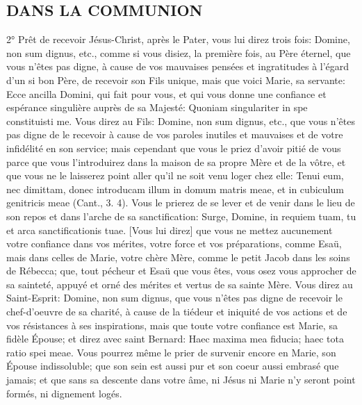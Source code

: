 \subsection{DANS LA COMMUNION}
 2° Prêt de recevoir Jésus-Christ, après le Pater, vous lui direz trois fois: Domine, non sum dignus, etc.,
comme si vous disiez, la première fois, au Père éternel, que vous n'êtes pas digne, à cause de vos mauvaises
pensées et ingratitudes à l'égard d'un si bon Père, de recevoir son Fils unique, mais que voici Marie, sa servante:
Ecce ancilla Domini, qui fait pour vous, et qui vous donne une confiance et espérance singulière auprès de sa
Majesté: Quoniam singulariter in spe constituisti me.
 Vous direz au Fils: Domine, non sum dignus, etc., que vous n'êtes pas digne de le recevoir à cause de vos
paroles inutiles et mauvaises et de votre infidélité en son service; mais cependant que vous le priez d'avoir pitié de
vous parce que vous l'introduirez dans la maison de sa propre Mère et de la vôtre, et que vous ne le laisserez
point aller qu'il ne soit venu loger chez elle: Tenui eum, nec dimittam, donec introducam illum in domum matris
meae, et in cubiculum genitricis meae (Cant., 3. 4). Vous le prierez de se lever et de venir dans le lieu de son
repos et dans l'arche de sa sanctification: Surge, Domine, in requiem tuam, tu et arca sanctificationis tuae. [Vous
lui direz] que vous ne mettez aucunement votre confiance dans vos mérites, votre force et vos préparations,
comme Esaü, mais dans celles de Marie, votre chère Mère, comme le petit Jacob dans les soins de Rébecca; que,
tout pécheur et Esaü que vous êtes, vous osez vous approcher de sa sainteté, appuyé et orné des mérites et
vertus de sa sainte Mère.
 Vous direz au Saint-Esprit: Domine, non sum dignus, que vous n'êtes pas digne de recevoir le chef-d'oeuvre
de sa charité, à cause de la tiédeur et iniquité de vos actions et de vos résistances à ses inspirations, mais que
toute votre confiance est Marie, sa fidèle Épouse; et direz avec saint Bernard: Haec maxima mea fiducia; haec tota
ratio spei meae. Vous pourrez même le prier de survenir encore en Marie, son Épouse indissoluble; que son sein
est aussi pur et son coeur aussi embrasé que jamais; et que sans sa descente dans votre âme, ni Jésus ni Marie
n'y seront point formés, ni dignement logés.

